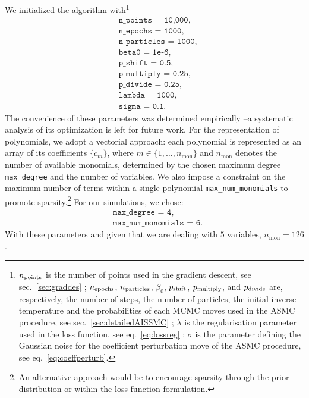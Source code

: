 \documentclass[11pt,a4paper]{article}
\begin{document}
	We initialized the algorithm with\footnote{$n_{\rm points}$ is the number of points used in the gradient descent, see sec.~\ref{sec:graddes} ; $n_{\rm epochs}$, $n_{\rm particles}$, $\beta_{0}$, $p_{\rm shift}$, $p_{\rm multiply}$, and $p_{\rm divide}$ are, respectively, the number of steps, the number of particles, the initial inverse temperature and the probabilities of each MCMC moves used in the ASMC procedure, see sec.~\ref{sec:detailedAISSMC} ; $\lambda$ is the regularisation parameter used in the loss function, see eq.~\eqref{eq:lossreg} ; $\sigma$ is the parameter defining the Gaussian noise for the coefficient perturbation move of the ASMC procedure, see eq.~\eqref{eq:coeffperturb}.}
	\begin{equation}	\label{eq:sample10000adaptativetemp}
		\begin{aligned}
			&\texttt{n\_points = 10,000},\\
			&\texttt{n\_epochs = 1000},\\
			&\texttt{n\_particles = 1000},\\
			&\texttt{beta0  = 1e-6}, \\
			&\texttt{p\_{shift} = 0.5},\\
			&\texttt{p\_{multiply} = 0.25},\\
			&\texttt{p\_{divide} = 0.25},\\
			&\texttt{lambda = 1000},\\
			&\texttt{sigma = 0.1}.
		\end{aligned}
	\end{equation}
	The convenience of these parameters was determined empirically --a systematic analysis of its optimization is left for future work. For the representation of polynomials, we adopt a vectorial approach: each polynomial is represented as an array of its coefficients $\{c_m\}$, where $m \in \{1,\dots,n_{\text{mon}}\}$ and $n_{\text{mon}}$ denotes the number of available monomials, determined by the chosen maximum degree \texttt{max\_degree} and the number of variables. We also impose a constraint on the maximum number of terms within a single polynomial \texttt{max\_num\_monomials} to promote sparsity.\footnote{An alternative approach would be to encourage sparsity through the prior distribution or within the loss function formulation.} For our simulations, we chose:
	\begin{equation} \label{eq:parampol}
		\begin{aligned}
			&\texttt{max\_degree = 4},\\
			&\texttt{max\_num\_monomials = 6.}
		\end{aligned}
	\end{equation}
With these parameters and given that we are dealing with $5$ variables, $n_{\text{mon}} = 126$.
	
\end{document}
